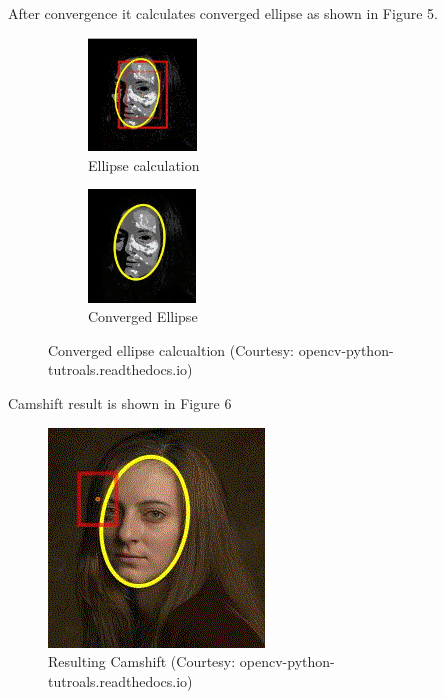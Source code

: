 \documentclass[11pt,a4paper]{article}
\begin{document}
				After convergence it calculates converged ellipse as shown in Figure 5.
				\begin{figure}[h!]
					\begin{subfigure}{0.5\textwidth}
						\includegraphics[width=0.6\linewidth, height=3cm]{../Images/msec.png} 
						\caption{Ellipse calculation}
					\end{subfigure}
					\begin{subfigure}{0.5\textwidth}
						\includegraphics[width=0.6\linewidth, height=3cm]{../Images/convergedellipse.png}
						\caption{Converged Ellipse}
					\end{subfigure}
					\caption{Converged ellipse calcualtion (Courtesy: opencv-python-tutroals.readthedocs.io)}
				\end{figure}
				
				Camshift result is shown in Figure 6
				\begin{figure}[h!]
					\includegraphics[scale = 0.5]{../Images/result.png}
					\centering
					\caption{Resulting Camshift (Courtesy: opencv-python-tutroals.readthedocs.io)}
				\end{figure}
		\newpage
\end{document}
